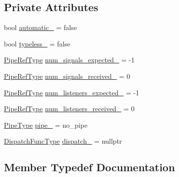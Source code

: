 \subsection*{Private Attributes}
\begin{DoxyCompactItemize}
\item 
bool \hyperlink{structvt_1_1pipe_1_1_pipe_state_afc74c762209659919822abb37dda8b89}{automatic\+\_\+} = false
\item 
bool \hyperlink{structvt_1_1pipe_1_1_pipe_state_af73f5f3e239e4db909b1cde2aa7de3f3}{typeless\+\_\+} = false
\item 
\hyperlink{namespacevt_ace18d74dd489d9ea506d38789fffce34}{Pipe\+Ref\+Type} \hyperlink{structvt_1_1pipe_1_1_pipe_state_a8f072bad48c155b0c8b43ca2f709cac5}{num\+\_\+signals\+\_\+expected\+\_\+} = -\/1
\item 
\hyperlink{namespacevt_ace18d74dd489d9ea506d38789fffce34}{Pipe\+Ref\+Type} \hyperlink{structvt_1_1pipe_1_1_pipe_state_ac5a387ab62c0961fe8ffa32e0e56c439}{num\+\_\+signals\+\_\+received\+\_\+} = 0
\item 
\hyperlink{namespacevt_ace18d74dd489d9ea506d38789fffce34}{Pipe\+Ref\+Type} \hyperlink{structvt_1_1pipe_1_1_pipe_state_a258aa24dd89b3b90e4f4045ec0d52cda}{num\+\_\+listeners\+\_\+expected\+\_\+} = -\/1
\item 
\hyperlink{namespacevt_ace18d74dd489d9ea506d38789fffce34}{Pipe\+Ref\+Type} \hyperlink{structvt_1_1pipe_1_1_pipe_state_ae46d41d7d03a6503e5b647cb9a424bcf}{num\+\_\+listeners\+\_\+received\+\_\+} = 0
\item 
\hyperlink{namespacevt_ac9852acda74d1896f48f406cd72c7bd3}{Pipe\+Type} \hyperlink{structvt_1_1pipe_1_1_pipe_state_a7444cbbce857d44145abb9e44eda23ea}{pipe\+\_\+} = no\+\_\+pipe
\item 
\hyperlink{structvt_1_1pipe_1_1_pipe_state_ad81b637847d9c3185420c58c9272ed7d}{Dispatch\+Func\+Type} \hyperlink{structvt_1_1pipe_1_1_pipe_state_aca06c747d1462b15cf61431ea7d35330}{dispatch\+\_\+} = nullptr
\end{DoxyCompactItemize}


\subsection{Member Typedef Documentation}
\mbox{\label{structvt_1_1pipe_1_1_pipe_state_ad81b637847d9c3185420c58c9272ed7d}} 
